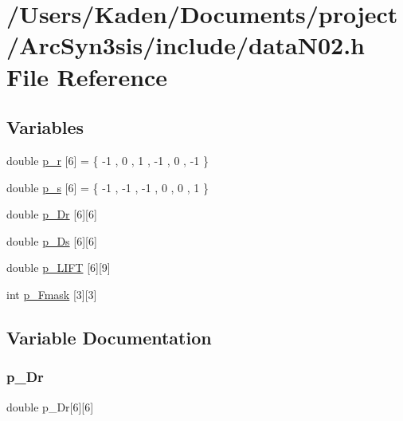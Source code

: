 \hypertarget{a00509}{}\section{/\+Users/\+Kaden/\+Documents/project/\+Arc\+Syn3sis/include/data\+N02.h File Reference}
\label{a00509}
\subsection*{Variables}
\begin{DoxyCompactItemize}
\item 
double \hyperlink{a00509_a0df60dbb73098f125698cce08e503a6e}{p\+\_\+r} \mbox{[}6\mbox{]} = \{ -\/1 , 0 , 1 , -\/1 , 0 , -\/1 \}
\item 
double \hyperlink{a00509_abd6b88b486d17d00eeac3a5cb31cda5a}{p\+\_\+s} \mbox{[}6\mbox{]} = \{ -\/1 , -\/1 , -\/1 , 0 , 0 , 1 \}
\item 
double \hyperlink{a00509_ae285bac3d0e41f5e7cf51bbd552fd453}{p\+\_\+\+Dr} \mbox{[}6\mbox{]}\mbox{[}6\mbox{]}
\item 
double \hyperlink{a00509_a75dab8f9530af8120d2bf5350308720e}{p\+\_\+\+Ds} \mbox{[}6\mbox{]}\mbox{[}6\mbox{]}
\item 
double \hyperlink{a00509_ab0d769e56dcd346024ae834d5a7fb7ce}{p\+\_\+\+L\+I\+FT} \mbox{[}6\mbox{]}\mbox{[}9\mbox{]}
\item 
int \hyperlink{a00509_a473896cbb6a7d08a5a195050cf00d8eb}{p\+\_\+\+Fmask} \mbox{[}3\mbox{]}\mbox{[}3\mbox{]}
\end{DoxyCompactItemize}


\subsection{Variable Documentation}
\mbox{\label{a00509_ae285bac3d0e41f5e7cf51bbd552fd453}} 
\subsubsection{\texorpdfstring{p\+\_\+\+Dr}{p\_Dr}}
{\footnotesize\ttfamily double p\+\_\+\+Dr\mbox{[}6\mbox{]}\mbox{[}6\mbox{]}}

